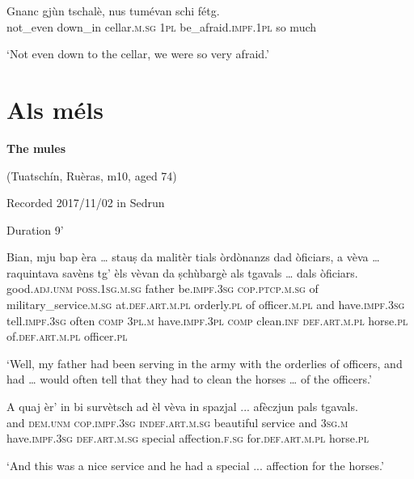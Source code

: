 \begin{linenumbers}
\gll  Gnanc gjùn tschalè, nus tumévan schi fétg.  \\
 not\_even down\_in cellar.\textsc{m.sg} \textsc{1pl} be\_afraid.\textsc{impf.1pl} so much\\
\end{linenumbers}
\medskip
\glt `Not even down to the cellar, we were so very afraid.'
\medskip

\section{Als méls}
\textbf{The mules}

\noindent
(Tuatschín, Ruèras, m10, aged 74)

\noindent
Recorded 2017/11/02 in Sedrun  

\noindent
Duration 9'

\bigskip

\begin{linenumbers}
\gll  Bian, mju bap èra … stauṣ da malitèr tials òrdònanzs dad òficiars, a vèva … raquintava savèns tg’ èls vèvan da ṣchùbargè als tgavals … dals òficiars.  \\
good.\textsc{adj.unm} \textsc{poss.1sg.m.sg} father be.\textsc{impf.3sg} {} \textsc{cop.ptcp.m.sg} of military\_service.\textsc{m.sg}  at.\textsc{def.art.m.pl} orderly.\textsc{pl} of officer.\textsc{m.pl}  and have.\textsc{impf.3sg} {} tell.\textsc{impf.3sg} often \textsc{comp} \textsc{3pl.m} have.\textsc{impf.3pl} \textsc{comp} clean.\textsc{inf} \textsc{def.art.m.pl} horse.\textsc{pl} {} of.\textsc{def.art.m.pl} officer.\textsc{pl}\\
\end{linenumbers}
\medskip
\glt `Well, my father had been serving in the army with the orderlies of officers, and had … would often tell that they had to clean the horses … of the officers.'
\medskip

\begin{linenumbers}
\gll  A quaj èr’ in bi survètsch ad èl vèva in spazjal\footnotemark{} ... afèczjun pals tgavals.  \\
and \textsc{dem.unm} \textsc{cop.impf.3sg} \textsc{indef.art.m.sg} beautiful service and \textsc{3sg.m}  have.\textsc{impf.3sg} \textsc{def.art.m.sg} special {} affection.\textsc{f.sg} for.\textsc{def.art.m.pl} horse.\textsc{pl}\\
\end{linenumbers}
\medskip
\glt `And this was a nice service and he had a special ... affection for  the horses.'
\medskip

